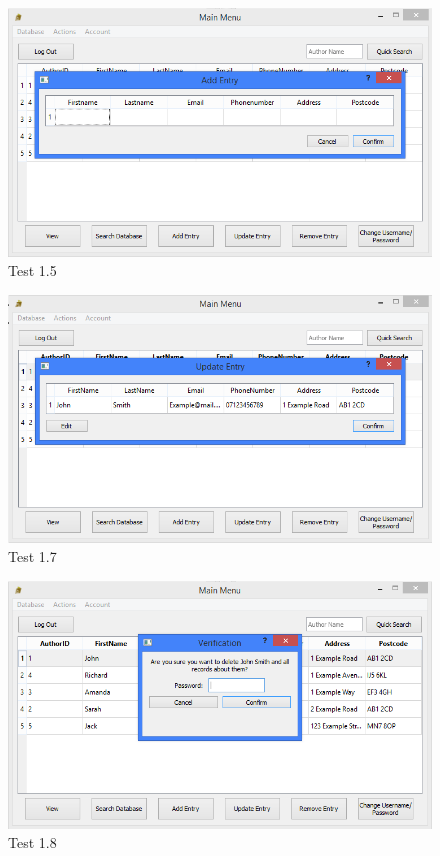 \begin{landscape}
\begin{figure}[H]
    \includegraphics[width=\textwidth]{./Testing/Evidence/AddEntryButtonTest.png}
    \caption{Test 1.5}  \label{fig:AddEntryButtonTest}
\end{figure}

\begin{figure}[H]
    \includegraphics[width=\textwidth]{./Testing/Evidence/UpdateEntryButtonTest.png}
    \caption{Test 1.7}  \label{fig:UpdateEntryButtonTest}
\end{figure}

\begin{figure}[H]
    \includegraphics[width=\textwidth]{./Testing/Evidence/RemoveEntryButtonTest.png}
    \caption{Test 1.8}  \label{fig:RemoveEntryButtonTest}
\end{figure}


\end{landscape}
